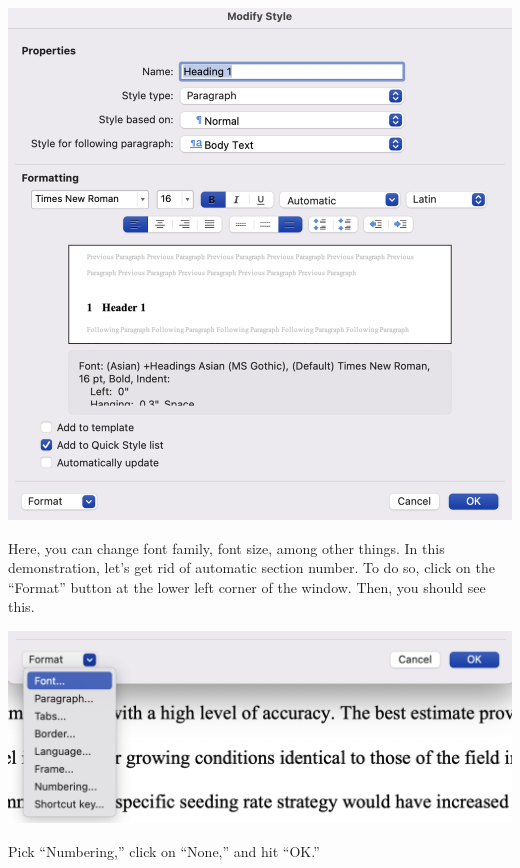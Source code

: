 \documentclass[
  letterpaper,
  DIV=11,
  numbers=noendperiod]{scrreprt}
\begin{document}
\includegraphics[width=1\textwidth,height=\textheight]{assets/pictures/style-change-4.png}

Here, you can change font family, font size, among other things. In this
demonstration, let's get rid of automatic section number. To do so,
click on the ``Format'' button at the lower left corner of the window.
Then, you should see this.

\includegraphics[width=1\textwidth,height=\textheight]{assets/pictures/style-change-5.png}

Pick ``Numbering,'' click on ``None,'' and hit ``OK.''
\end{document}

